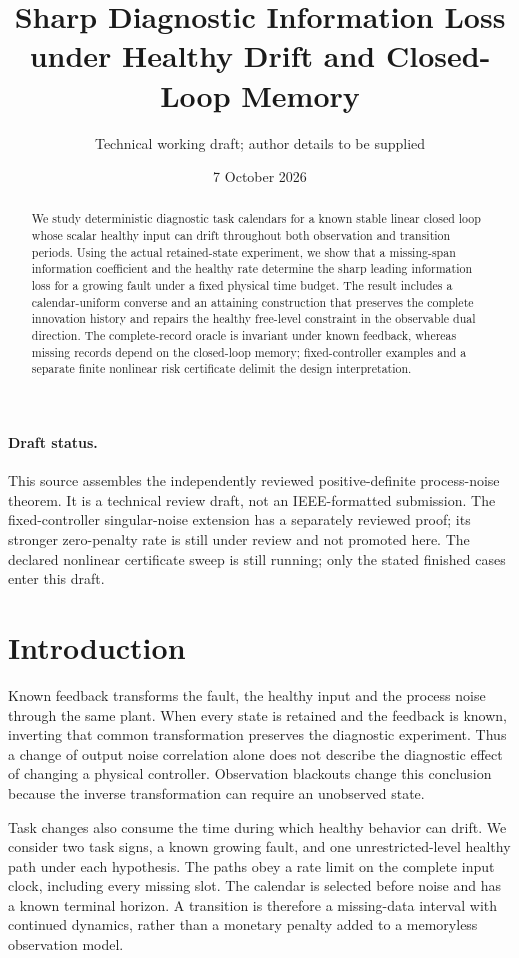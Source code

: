 \documentclass[11pt]{article}
\title{Sharp Diagnostic Information Loss under Healthy Drift and Closed-Loop Memory}
\author{Technical working draft; author details to be supplied}
\date{7 October 2026}
\begin{document}
\maketitle
\begin{abstract}
We study deterministic diagnostic task calendars for a known stable linear
closed loop whose scalar healthy input can drift throughout both observation
and transition periods.
Using the actual retained-state experiment, we show that a missing-span
information coefficient and the healthy rate determine the sharp leading
information loss for a growing fault under a fixed physical time budget.
The result includes a calendar-uniform converse and an attaining construction
that preserves the complete innovation history and repairs the healthy
free-level constraint in the observable dual direction.
The complete-record oracle is invariant under known feedback, whereas missing
records depend on the closed-loop memory; fixed-controller examples and a
separate finite nonlinear risk certificate delimit the design interpretation.
\end{abstract}

\paragraph{Draft status.}
This source assembles the independently reviewed positive-definite process-noise
theorem. It is a technical review draft, not an IEEE-formatted submission.
The fixed-controller singular-noise extension has a separately reviewed proof;
its stronger zero-penalty rate is still under review and not promoted here.
The declared nonlinear
certificate sweep is still running; only the stated finished cases enter this draft.

\section{Introduction}
Known feedback transforms the fault, the healthy input and the process noise
through the same plant. When every state is retained and the feedback is known,
inverting that common transformation preserves the diagnostic experiment.
Thus a change of output noise correlation alone does not describe the diagnostic
effect of changing a physical controller. Observation blackouts change this
conclusion because the inverse transformation can require an unobserved state.

Task changes also consume the time during which healthy behavior can drift.
We consider two task signs, a known growing fault, and one unrestricted-level
healthy path under each hypothesis. The paths obey a rate limit on the complete
input clock, including every missing slot. The calendar is selected before noise
and has a known terminal horizon. A transition is therefore a missing-data
interval with continued dynamics, rather than a monetary penalty added to a
memoryless observation model.
\end{document}
